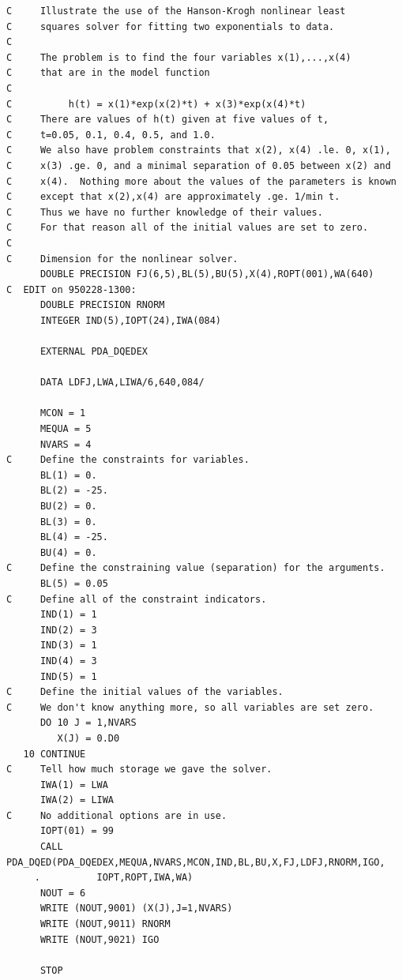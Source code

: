 \documentclass[11pt,twoside]{article}
\begin{document}
\begin{verbatim}
C     Illustrate the use of the Hanson-Krogh nonlinear least
C     squares solver for fitting two exponentials to data.
C
C     The problem is to find the four variables x(1),...,x(4)
C     that are in the model function
C
C          h(t) = x(1)*exp(x(2)*t) + x(3)*exp(x(4)*t)
C     There are values of h(t) given at five values of t,
C     t=0.05, 0.1, 0.4, 0.5, and 1.0.
C     We also have problem constraints that x(2), x(4) .le. 0, x(1),
C     x(3) .ge. 0, and a minimal separation of 0.05 between x(2) and
C     x(4).  Nothing more about the values of the parameters is known
C     except that x(2),x(4) are approximately .ge. 1/min t.
C     Thus we have no further knowledge of their values.
C     For that reason all of the initial values are set to zero.
C
C     Dimension for the nonlinear solver.
      DOUBLE PRECISION FJ(6,5),BL(5),BU(5),X(4),ROPT(001),WA(640)
C  EDIT on 950228-1300:
      DOUBLE PRECISION RNORM
      INTEGER IND(5),IOPT(24),IWA(084)

      EXTERNAL PDA_DQEDEX

      DATA LDFJ,LWA,LIWA/6,640,084/

      MCON = 1
      MEQUA = 5
      NVARS = 4
C     Define the constraints for variables.
      BL(1) = 0.
      BL(2) = -25.
      BU(2) = 0.
      BL(3) = 0.
      BL(4) = -25.
      BU(4) = 0.
C     Define the constraining value (separation) for the arguments.
      BL(5) = 0.05
C     Define all of the constraint indicators.
      IND(1) = 1
      IND(2) = 3
      IND(3) = 1
      IND(4) = 3
      IND(5) = 1
C     Define the initial values of the variables.
C     We don't know anything more, so all variables are set zero.
      DO 10 J = 1,NVARS
         X(J) = 0.D0
   10 CONTINUE
C     Tell how much storage we gave the solver.
      IWA(1) = LWA
      IWA(2) = LIWA
C     No additional options are in use.
      IOPT(01) = 99
      CALL PDA_DQED(PDA_DQEDEX,MEQUA,NVARS,MCON,IND,BL,BU,X,FJ,LDFJ,RNORM,IGO,
     .          IOPT,ROPT,IWA,WA)
      NOUT = 6
      WRITE (NOUT,9001) (X(J),J=1,NVARS)
      WRITE (NOUT,9011) RNORM
      WRITE (NOUT,9021) IGO

      STOP


\end{verbatim}
\end{document}
